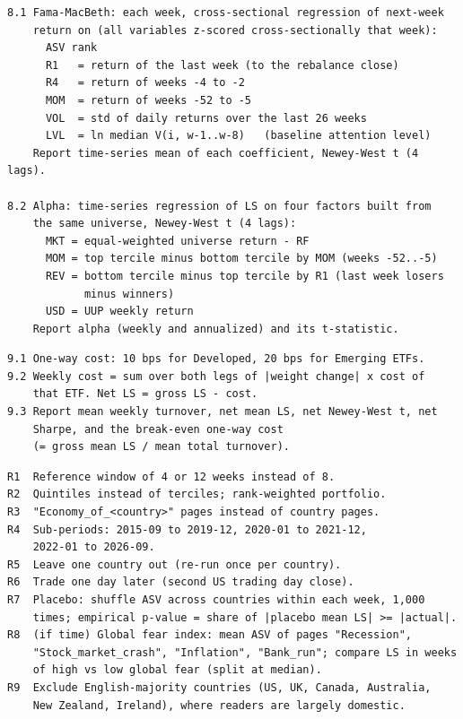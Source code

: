 \begin{Verbatim}[fontsize=\footnotesize, frame=single, framerule=0.3pt, rulecolor=\color{black!35}, framesep=2.5mm, samepage=true, label={\textcolor{black}{\textbf{8. IS IT NEW INFORMATION?}}}]
8.1 Fama-MacBeth: each week, cross-sectional regression of next-week
    return on (all variables z-scored cross-sectionally that week):
      ASV rank
      R1   = return of the last week (to the rebalance close)
      R4   = return of weeks -4 to -2
      MOM  = return of weeks -52 to -5
      VOL  = std of daily returns over the last 26 weeks
      LVL  = ln median V(i, w-1..w-8)   (baseline attention level)
    Report time-series mean of each coefficient, Newey-West t (4 lags).

8.2 Alpha: time-series regression of LS on four factors built from
    the same universe, Newey-West t (4 lags):
      MKT = equal-weighted universe return - RF
      MOM = top tercile minus bottom tercile by MOM (weeks -52..-5)
      REV = bottom tercile minus top tercile by R1 (last week losers
            minus winners)
      USD = UUP weekly return
    Report alpha (weekly and annualized) and its t-statistic.
\end{Verbatim}

\begin{Verbatim}[fontsize=\footnotesize, frame=single, framerule=0.3pt, rulecolor=\color{black!35}, framesep=2.5mm, samepage=true, label={\textcolor{black}{\textbf{9. TRANSACTION COSTS}}}]
9.1 One-way cost: 10 bps for Developed, 20 bps for Emerging ETFs.
9.2 Weekly cost = sum over both legs of |weight change| x cost of
    that ETF. Net LS = gross LS - cost.
9.3 Report mean weekly turnover, net mean LS, net Newey-West t, net
    Sharpe, and the break-even one-way cost
    (= gross mean LS / mean total turnover).
\end{Verbatim}

\begin{Verbatim}[fontsize=\footnotesize, frame=single, framerule=0.3pt, rulecolor=\color{black!35}, framesep=2.5mm, samepage=true, label={\textcolor{black}{\textbf{10. ROBUSTNESS (fixed list, no test added after seeing results)}}}]
R1  Reference window of 4 or 12 weeks instead of 8.
R2  Quintiles instead of terciles; rank-weighted portfolio.
R3  "Economy_of_<country>" pages instead of country pages.
R4  Sub-periods: 2015-09 to 2019-12, 2020-01 to 2021-12,
    2022-01 to 2026-09.
R5  Leave one country out (re-run once per country).
R6  Trade one day later (second US trading day close).
R7  Placebo: shuffle ASV across countries within each week, 1,000
    times; empirical p-value = share of |placebo mean LS| >= |actual|.
R8  (if time) Global fear index: mean ASV of pages "Recession",
    "Stock_market_crash", "Inflation", "Bank_run"; compare LS in weeks
    of high vs low global fear (split at median).
R9  Exclude English-majority countries (US, UK, Canada, Australia,
    New Zealand, Ireland), where readers are largely domestic.
\end{Verbatim}

